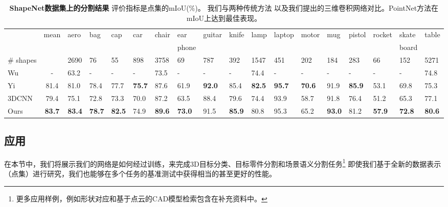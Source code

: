\begin{table}[th!]
    \small
    \centering
    \begin{tabular}[width=\linewidth]{l|c|p{0.5cm}p{0.4cm}p{0.4cm}p{0.4cm}p{0.5cm}p{0.6cm}p{0.5cm}p{0.5cm}p{0.5cm}p{0.6cm}p{0.6cm}p{0.3cm}p{0.5cm}p{0.6cm}p{0.6cm}p{0.6cm}}
    \hline
    ~        & mean & aero & bag & cap & car & chair & ear & guitar & knife & lamp & laptop & motor & mug & pistol & rocket & skate & table \\ 
    &   & &  &  &  &  & phone &  &   &  &  & &    &    &    & board &  \\ \hline
    \# shapes & & 2690 & 76 & 55 & 898 & 3758 & 69 & 787 & 392 & 1547 & 451 & 202 & 184 & 283 & 66 & 152 & 5271 \\ \hline
    Wu~\cite{Wu2014248} &  -  & 63.2  & - &      -    & -   & 73.5 & - &    - &    - &     74.4  & -    & - &   -   &   -   &   - & -  &  74.8 \\
    Yi~\cite{Yi16} & 81.4 & 81.0 & 78.4 & 77.7 & \textbf{75.7} & 87.6 & 61.9 & \textbf{92.0} & 85.4 & \textbf{82.5} & \textbf{95.7} & \textbf{70.6} & 91.9 & \textbf{85.9} & 53.1 & 69.8 & 75.3 \\ \hline
    3DCNN & 79.4 & 75.1 & 72.8 & 73.3 & 70.0 & 87.2 & 63.5 & 88.4 & 79.6 & 74.4 & 93.9 & 58.7 & 91.8 & 76.4 & 51.2 & 65.3 & 77.1 \\ 
    Ours & \textbf{83.7} & \textbf{83.4} & \textbf{78.7} & \textbf{82.5} & 74.9 & \textbf{89.6} & \textbf{73.0} & 91.5 & \textbf{85.9} & 80.8 & 95.3 & 65.2 & \textbf{93.0} & 81.2 & \textbf{57.9} & \textbf{72.8} & \textbf{80.6} \\ \hline
    \end{tabular}
    \caption{\textbf{ShapeNet数据集上的分割结果} 评价指标是点集的mIoU(\%)。 我们与两种传统方法 \cite{Wu2014248} \cite{Wu2014248} 以及我们提出的三维卷积网络对比。PointNet方法在mIoU上达到最佳表现。}
    \label{tab:segmentation}
\end{table}



\subsection{应用}
\label{sec:application}
在本节中，我们将展示我们的网络是如何经过训练，来完成3D目标分类、目标零件分割和场景语义分割任务\footnote{更多应用样例，例如形状对应和基于点云的CAD模型检索包含在补充资料中。} 即使我们基于全新的数据表示（点集）进行研究，我们也能够在多个任务的基准测试中获得相当的甚至更好的性能。

